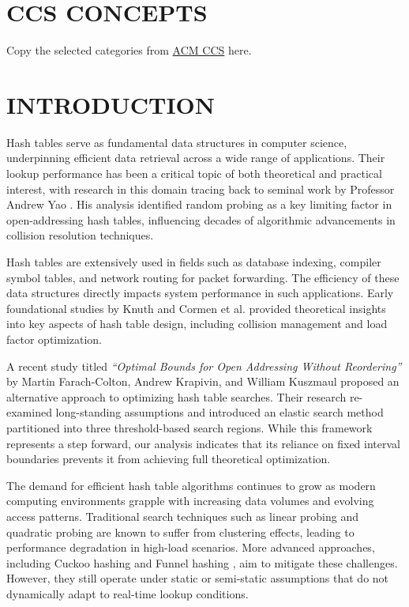 \documentclass[letterpaper]{article}
\begin{document}
\section*{CCS CONCEPTS}
Copy the selected categories from \href{https://dl.acm.org/ccs}{ACM CCS} here.


\section{INTRODUCTION}

Hash tables serve as fundamental data structures in computer science, underpinning efficient data retrieval across a wide range of applications. Their lookup performance has been a critical topic of both theoretical and practical interest, with research in this domain tracing back to seminal work by Professor Andrew Yao \cite{yao1981}. His analysis identified random probing as a key limiting factor in open-addressing hash tables, influencing decades of algorithmic advancements in collision resolution techniques.

Hash tables are extensively used in fields such as database indexing, compiler symbol tables, and network routing for packet forwarding. The efficiency of these data structures directly impacts system performance in such applications. Early foundational studies by Knuth \cite{knuth1998} and Cormen et al. \cite{cormen2009} provided theoretical insights into key aspects of hash table design, including collision management and load factor optimization.

A recent study titled \textit{``Optimal Bounds for Open Addressing Without Reordering''} by Martin Farach-Colton, Andrew Krapivin, and William Kuszmaul \cite{farach2024} proposed an alternative approach to optimizing hash table searches. Their research re-examined long-standing assumptions and introduced an elastic search method partitioned into three threshold-based search regions. While this framework represents a step forward, our analysis indicates that its reliance on fixed interval boundaries prevents it from achieving full theoretical optimization.

The demand for efficient hash table algorithms continues to grow as modern computing environments grapple with increasing data volumes and evolving access patterns. Traditional search techniques such as linear probing and quadratic probing are known to suffer from clustering effects, leading to performance degradation in high-load scenarios. More advanced approaches, including Cuckoo hashing \cite{pagh2004} and Funnel hashing \cite{mitzenmacher2005}, aim to mitigate these challenges. However, they still operate under static or semi-static assumptions that do not dynamically adapt to real-time lookup conditions.
\end{document}
